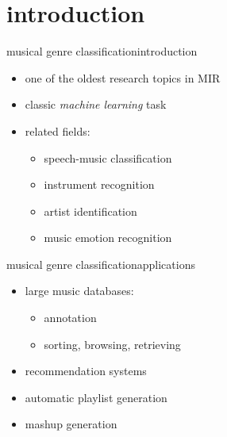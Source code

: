     \section[intro]{introduction}
        \begin{frame}{musical genre classification}{introduction}
            \begin{itemize}
                \item	one of the oldest research topics in MIR
                \item<2->	classic \textit{machine learning }task
                \item<3->	related fields:
                    \begin{itemize}
                        \item	speech-music classification
                        \item	instrument recognition
                        \item   artist identification
                        \item   music emotion recognition
                    \end{itemize}
            \end{itemize}
        \end{frame}

        \begin{frame}{musical genre classification}{applications}
            \begin{itemize}
                \item	large music databases:
                    \begin{itemize}
                        \item	annotation
                        \item	sorting, browsing, retrieving
                    \end{itemize}
                \item recommendation systems
                \item	automatic playlist generation
                \item	mashup generation
            \end{itemize}
        \end{frame}


